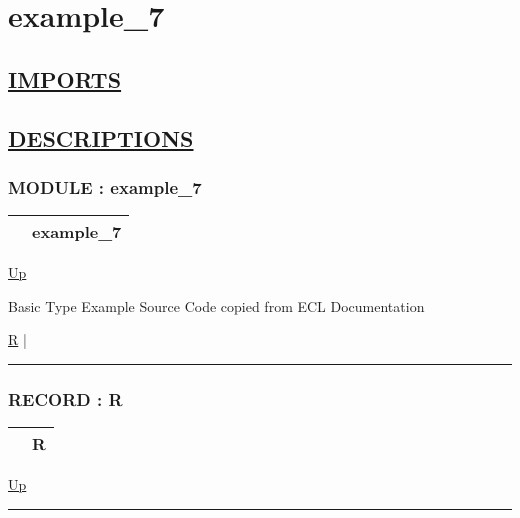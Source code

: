 \chapter*{example\_7}
\hypertarget{ecldoc:toc:example_7}{}

\section*{\underline{IMPORTS}}

\section*{\underline{DESCRIPTIONS}}
\subsection*{MODULE : example\_7}
\hypertarget{ecldoc:example_7}{}

{\renewcommand{\arraystretch}{1.5}
\begin{tabularx}{\textwidth}{|>{\raggedright\arraybackslash}l|X|}
\hline
\hspace{0pt} & example\_7 \\
\hline
\end{tabularx}
}

\hyperlink{ecldoc:toc:root}{Up}

\par
Basic Type Example Source Code copied from ECL Documentation


\hyperlink{ecldoc:example_7.r}{R}  |

\rule{\textwidth}{0.4pt}

\subsection*{RECORD : R}
\hypertarget{ecldoc:example_7.r}{}

{\renewcommand{\arraystretch}{1.5}
\begin{tabularx}{\textwidth}{|>{\raggedright\arraybackslash}l|X|}
\hline
\hspace{0pt} & R \\
\hline
\end{tabularx}
}

\hyperlink{ecldoc:example_7}{Up}

\par


\rule{\textwidth}{0.4pt}


